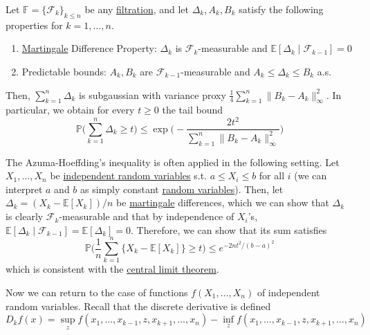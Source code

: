   \begin{theorem}
    \label{thm:azuma-hoeffding-inequality}
  Let $\mathbb{F} = \{ \mathcal{F}_k \}_{k \leq n}$ be any \hyperref[sp-def:filtration]{filtration}, and let $\Delta_k, A_k, B_k$ satisfy the following properties for $k = 1, \ldots, n$. 
  \begin{enumerate}
      \item \hyperref[sp-def:martingale]{Martingale} Difference Property: $\Delta_k$ is $\mathcal{F}_k$-measurable and $\mathbb{E}[\Delta_k \mid \mathcal{F}_{k-1}] = 0$ 
      \item Predictable bounds: $A_k, B_k$ are $\mathcal{F}_{k-1}$-measurable and $A_k \leq \Delta_k \leq B_k$ a.s. 
  \end{enumerate}
  Then, $\sum_{k=1}^n \Delta_k$ is subgaussian with variance proxy $\frac{1}{4} \sum_{k=1}^n \|B_k - A_k\|^2_\infty$. In particular, we obtain for every $t \geq 0$ the tail bound 
  \begin{equation}
    \mathbb{P} \bigg( \sum_{k=1}^n \Delta_k \geq t \bigg) \leq \exp \bigg( - \frac{2t^2}{\sum_{k=1}^n \|B_k - A_k\|_\infty^2} \bigg)
  \end{equation}
  \end{theorem}

  The Azuma-Hoeffding's inequality is often applied in the following setting. Let $X_1, \ldots, X_n$ be \hyperref[prob-def:independent-random-variables]{independent random variables} s.t. $a \leq X_i \leq b$ for all $i$ (we can interpret $a$ and $b$ as simply constant \hyperref[prob-def:random-variable]{random variables}). Then, let $\Delta_k = (X_k - \mathbb{E}[X_k])/n$ be \hyperref[sp-def:martingale]{martingale} differences, which we can show that $\Delta_k$ is clearly $\mathcal{F}_k$-measurable and that by independence of $X_i$'s,  $\mathbb{E}[\Delta_k \mid \mathcal{F}_{k-1}] = \mathbb{E}[\Delta_k] = 0$. Therefore, we can show that its sum satisfies
  \begin{equation}
    \mathbb{P} \bigg( \frac{1}{n} \sum_{k=1}^n \{X_k - \mathbb{E}[X_k]\} \geq t \bigg) \leq e^{-2n t^2 / (b - a)^2}
  \end{equation}
  which is consistent with the \hyperref[prob-thm:central-limit-theorem]{central limit theorem}. 

  Now we can return to the case of functions $f(X_1, \ldots, X_n)$ of independent random variables. Recall that the discrete derivative is defined 
  \begin{equation}
    D_k f(x) = \sup_z f(x_1, \ldots, x_{k-1}, z, x_{k+1}, \ldots, x_n) - \inf_z f(x_1, \ldots, x_{k-1}, z, x_{k+1}, \ldots, x_n)
  \end{equation}

